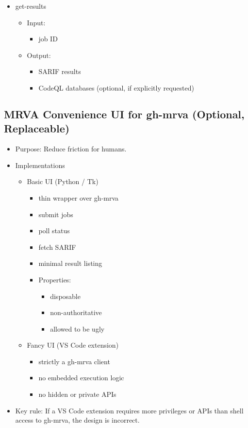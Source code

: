 \documentclass[11pt]{article}
\begin{document}
\begin{itemize}
\begin{itemize}
\item get-results
\begin{itemize}
\item Input:
\begin{itemize}
\item job ID
\end{itemize}
\item Output:
\begin{itemize}
\item SARIF results
\item CodeQL databases (optional, if explicitly requested)
\end{itemize}
\end{itemize}
\end{itemize}
\end{itemize}
\subsection{MRVA Convenience UI for gh-mrva (Optional, Replaceable)}
\label{sec:orgf19b4af}
\begin{itemize}
\item Purpose:  Reduce friction for humans.

\item Implementations
\begin{itemize}
\item Basic UI (Python / Tk)
\begin{itemize}
\item thin wrapper over gh-mrva
\item submit jobs
\item poll status
\item fetch SARIF
\item minimal result listing

\item Properties:
\begin{itemize}
\item disposable
\item non-authoritative
\item allowed to be ugly
\end{itemize}
\end{itemize}

\item Fancy UI (VS Code extension)
\begin{itemize}
\item strictly a gh-mrva client
\item no embedded execution logic
\item no hidden or private APIs
\end{itemize}
\end{itemize}

\item Key rule:
If a VS Code extension requires more privileges or APIs than shell access
to gh-mrva, the design is incorrect.
\end{itemize}
\end{document}
